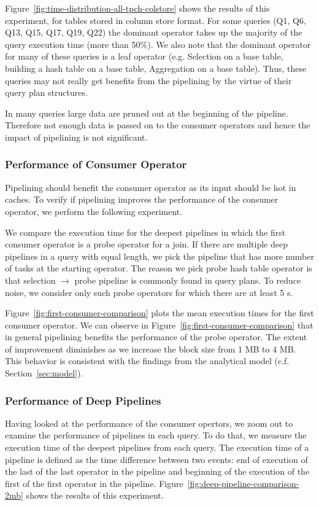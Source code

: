 Figure~\ref{fig:time-distribution-all-tpch-colstore} shows the results of this experiment, for tables stored in column store format. 
For some queries (Q1, Q6, Q13, Q15, Q17, Q19, Q22) the dominant operator takes up the majority of the query execution time (more than 50\%).
We also note that the dominant operator for many of these queries is a leaf operator (e.g. Selection on a base table, building a hash table on a base table, Aggregation on a base table). 
Thus, these queries may not really get benefits from the pipelining by the virtue of their query plan structures.

In many queries large data are pruned out at the beginning of the pipeline. 
Therefore not enough data is passed on to the consumer operators and hence the impact of pipelining is not significant. 

\subsubsection{Performance of Consumer Operator}
Pipelining should benefit the consumer operator as its input should be hot in caches.
To verify if pipelining improves the performance of the consumer operator, we perform the following experiment.

We compare the \wo{} execution time for the deepest pipelines in which the first consumer operator is a probe operator for a join.
If there are multiple deep pipelines in a query with equal length, we pick the pipeline that has more number of tasks at the starting operator. 
The reason we pick probe hash table operator is that selection $\rightarrow$ probe pipeline is commonly found in query plans.
To reduce noise, we consider only such probe operators for which there are at least 5 \wo{}s.

Figure~\ref{fig:first-consumer-comparison} plots the mean \wo{} execution times for the first consumer operator.
We can observe in Figure~\ref{fig:first-consumer-comparison} that in general pipelining benefits the performance of the probe operator. 
The extent of improvement diminishes as we increase the block size from 1 MB to 4 MB.
This behavior is consistent with the findings from the analytical model (c.f. Section~\ref{sec:model}).

\subsubsection{Performance of Deep Pipelines}
Having looked at the performance of the consumer opertors, we zoom out to examine the performance of pipelines in each query.
To do that, we measure the execution time of the deepest pipelines from each query.
The execution time of a pipeline is defined as the time difference between two events: end of execution of the last \wo{} of the last operator in the pipeline and beginning of the execution of the first \wo{} of the first operator in the pipeline. 
Figure~\ref{fig:deep-pipeline-comparison-2mb} shows the results of this experiment. 

